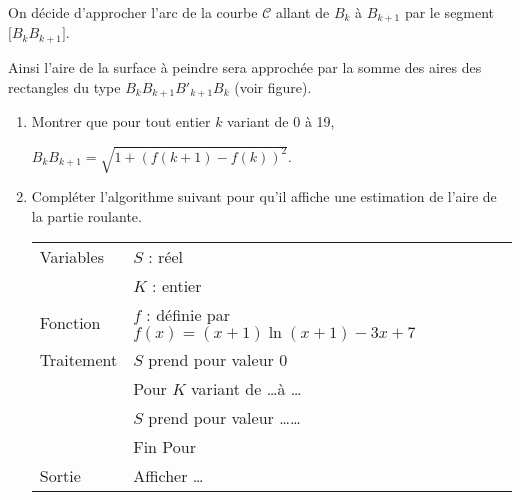 \documentclass[10pt]{article}
\begin{document}
\begin{enumerate}
\medskip

On décide d'approcher l'arc de la courbe $\mathcal{C}$
allant de $B_k$ à $B_{k+1}$ par le segment $\biggl[B_kB_{k+1}\biggr]$.

Ainsi l'aire de la surface à peindre sera  approchée par la somme des aires des
rectangles du type $B_k B_{k+1} B'_{k+1}B_k$ (voir figure).
	\begin{enumerate}
		\item Montrer que pour tout entier $k$ variant de 0 à 19, 
		
		$B_kB_{k+1} = \displaystyle\sqrt{1 + \left (f(k + 1) - f(k)\right )^2}$.
		\item Compléter l'algorithme suivant pour qu'il affiche une estimation de l'aire de la partie roulante.
		
\begin{center}
\begin{tabularx}{0.9\linewidth}{|l|X|}\hline		
Variables 	&$S$ : réel\\
			&$K$ : entier\\
Fonction 	&$f$ : définie par $f(x) = (x + 1)\ln(x + 1)- 3x + 7$\\ \hline
Traitement	&$S$ prend pour valeur $0$\\
			&Pour $K$ variant de \ldots \:à\: \ldots\\
			&\hspace{1cm}$S$ prend pour valeur \:\ldots \ldots\\
			&Fin Pour\\ \hline
Sortie 		&Afficher \ldots\\ \hline
\end{tabularx}
\end{center}
	\end{enumerate}
\end{enumerate}
\end{document}
